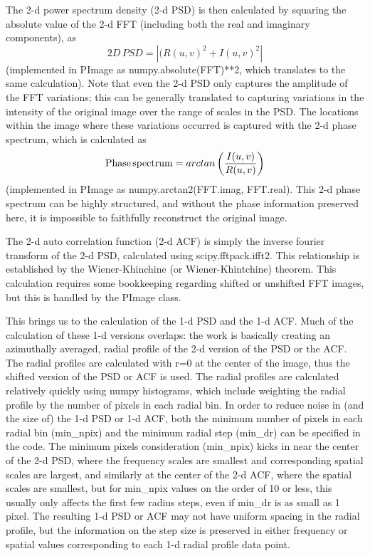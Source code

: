 \documentclass[11pt,preprint]{aastex}
\begin{document}
The 2-d power spectrum density (2-d PSD) is then calculated by squaring the absolute value of the 2-d FFT (including both the real and imaginary components), as
\begin{equation}
2D\, PSD= \left| (R(u,v)^2 + I(u,v)^2 \right|
\end{equation}
(implemented in PImage as numpy.absolute(FFT)**2, which translates to the same calculation).  Note that even the 2-d PSD only captures the amplitude of the FFT variations; this can be generally translated to capturing variations in the intensity of the original image over the range of scales in the PSD. The locations within the image where these variations occurred is captured with the 2-d phase spectrum, which is calculated as
\begin{equation}
{\rm Phase\,spectrum} = arctan\left(I(u,v) \over R(u,v) \right)
\end{equation}
(implemented in PImage as numpy.arctan2(FFT.imag, FFT.real). This 2-d phase spectrum can be highly structured, and without the phase information preserved here, it is impossible to faithfully reconstruct the original image. 

The 2-d auto correlation function (2-d ACF) is simply the inverse fourier transform of the 2-d PSD, calculated using scipy.fftpack.ifft2. This relationship is established by the Wiener-Khinchine (or Wiener-Khintchine) theorem.  This calculation requires some bookkeeping regarding shifted or unshifted FFT images, but this is handled by the PImage class. 

This brings us to the calculation of the 1-d PSD and the 1-d ACF. Much of the calculation of these 1-d versions overlaps: the work is basically creating an azimuthally averaged, radial profile of the 2-d version of the PSD or the ACF. The radial profiles are calculated with r=0 at the center of the image, thus the shifted version of the PSD or ACF is used. The radial profiles are calculated relatively quickly using numpy histograms, which include weighting the radial profile by the number of pixels in each radial bin. In order to reduce noise in (and the size of) the 1-d PSD or 1-d ACF, both the minimum number of pixels in each radial bin (min\_npix) and the minimum radial step (min\_dr) can be specified in the code. The minimum pixels consideration (min\_npix) kicks in near the center of the 2-d PSD, where the frequency scales are smallest and corresponding spatial scales are largest, and similarly at the center of the 2-d ACF, where the spatial scales are smallest, but for min\_npix values on the order of 10 or less, this usually only affects the first few radius steps, even if min\_dr is as small as 1 pixel.  The resulting 1-d PSD or ACF may not have uniform spacing in the radial profile, but the information on the step size is preserved in either frequency or spatial values corresponding to each 1-d radial profile data point. 
\end{document}
